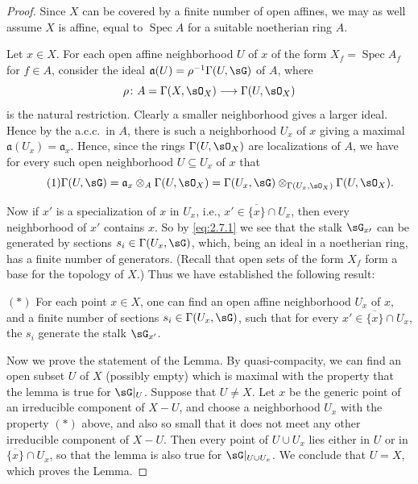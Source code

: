 \begin{proof}
Since $X$ can be covered by a finite number of open affines, we may as well assume $X$ is affine, equal to $\operatorname{Spec}A$ for a suitable noetherian ring $A$.

Let $x\in X$. For each open affine neighborhood $U$ of $x$ of the form $X_f=\operatorname{Spec}A_f$ for $f\in A$, consider the ideal $\mathfrak{a}(U)=\rho^{-1}\Gamma(U,\sG)$ of $A$, where
\[
\rho\colon A = \Gamma(X,\sO_X) \longrightarrow \Gamma(U,\sO_X)
\]
is the natural restriction. Clearly a smaller neighborhood gives a larger ideal. Hence by the a.c.c.\ in $A$, there is such a neighborhood $U_x$ of $x$ giving a maximal $\mathfrak{a}(U_x)=\mathfrak{a}_x$. Hence, since the rings $\Gamma(U,\sO_X)$ are localizations of $A$, we have for every such open neighborhood $U\subseteq U_x$ of $x$ that
\begin{equation}\tag{1}\label{eq:2.7.1}
\Gamma(U,\sG) = \mathfrak{a}_x \otimes_A \Gamma(U,\sO_X) = \Gamma(U_x,\sG) \otimes_{\Gamma(U_x,\sO_X)} \Gamma(U,\sO_X).
\end{equation}

Now if $x'$ is a specialization of $x$ in $U_x$, i.e., $x'\in\overline{\{x\}}\cap U_x$, then every neighborhood of $x'$ contains $x$. So by \eqref{eq:2.7.1} we see that the stalk $\sG_{x\prime}$ can be generated by sections $s_i\in\Gamma(U_x,\sG)$, which, being an ideal in a noetherian ring, has a finite number of generators. (Recall that open sets of the form $X_f$ form a base for the topology of $X$.) Thus we have established the following result:

$(*)$ For each point $x\in X$, one can find an open affine neighborhood $U_x$ of $x$, and a finite number of sections $s_i\in\Gamma(U_x,\sG)$, such that for every $x'\in\overline{\{x\}}\cap U_x$, the $s_i$ generate the stalk $\sG_{x'}$.

Now we prove the statement of the Lemma. By quasi-compacity, we can find an open subset $U$ of $X$ (possibly empty) which is maximal with the property that the lemma is true for $\sG|_U$. Suppose that $U\neq X$. Let $x$ be the generic point of an irreducible component of $X-U$, and choose a neighborhood $U_x$ with the property $(*)$ above, and also so small that it does not meet any other irreducible component of $X-U$. Then every point of $U\cup U_x$ lies either in $U$ or in $\overline{\{x\}}\cap U_x$, so that the lemma is also true for $\sG|_{U\cup U_x}$. We conclude that $U=X$, which proves the Lemma.
\end{proof}


